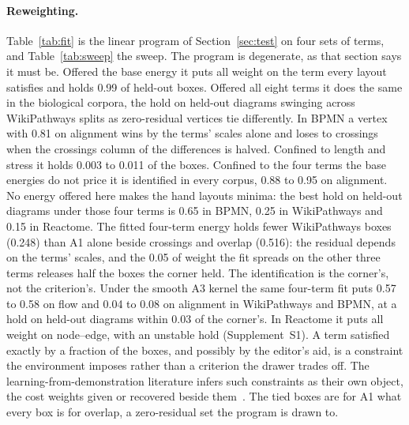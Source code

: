 \documentclass[11pt]{article}
\begin{document}
\paragraph{Reweighting.} Table~\ref{tab:fit} is the linear program of
Section~\ref{sec:test} on four sets of terms, and Table~\ref{tab:sweep} the sweep. The
program is degenerate, as that section says it must be. Offered the base energy it puts
all weight on the term every layout satisfies and holds 0.99 of held-out boxes. Offered
all eight terms it does the same in the biological corpora, the hold on held-out diagrams
swinging across WikiPathways splits as zero-residual vertices tie differently. In BPMN a
vertex with 0.81 on alignment wins by the terms' scales alone and loses to crossings when
the crossings column of the differences is halved. Confined to length and
stress it holds 0.003 to 0.011 of the boxes. Confined to the four terms the base energies
do not price it is identified in every corpus, 0.88 to 0.95 on alignment. No energy
offered here makes the hand layouts minima: the best hold on held-out diagrams under
those four terms is 0.65 in BPMN, 0.25 in WikiPathways and 0.15 in Reactome. The fitted
four-term energy holds fewer WikiPathways boxes (0.248) than A1 alone beside crossings and
overlap (0.516): the residual depends on the terms' scales, and the 0.05 of weight the fit
spreads on the other three terms releases half the boxes the corner held. The
identification is the corner's, not the criterion's. Under the smooth A3 kernel the same
four-term fit puts 0.57 to 0.58 on flow and 0.04 to 0.08 on alignment in WikiPathways and
BPMN, at a hold on held-out diagrams within 0.03 of the corner's. In Reactome it puts all
weight on node--edge, with an unstable hold (Supplement~S1). A term satisfied exactly by
a fraction of the boxes, and possibly by the editor's aid, is a constraint the
environment imposes rather than a criterion the drawer trades off. The
learning-from-demonstration literature infers such constraints as their own object, the
cost weights given or recovered beside them~\cite{chou20, scobee20}. The tied boxes are
for A1 what every box is for overlap, a zero-residual set the program is drawn to.
\end{document}
